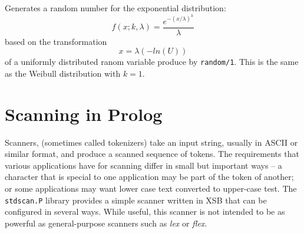 \begin{description}
 
%
Generates a random number for the exponential distribution:
\[
  f(x;k,\lambda) = \frac{e^{-(x/\lambda)^h}}{\lambda}
\]
based on the transformation
\[
  x = \lambda(-ln(U))
\]
of a uniformly distributed ranom variable produce by {\tt random/1}.
This is the same as the Weibull distribution with $k = 1$.


\end{description}

\section{Scanning in Prolog}

Scanners, (sometimes called tokenizers) take an input string, usually
in ASCII or similar format, and produce a scanned sequence of tokens.
The requirements that various applications have for scanning differ in
small but important ways -- a character that is special to one
application may be part of the token of another; or some applications
may want lower case text converted to upper-case test.  The {\tt
stdscan.P} library provides a simple scanner written in XSB that can
be configured in several ways.  While useful, this scanner is not
intended to be as powerful as general-purpose scanners such as {\em
lex} or {\em flex}.

